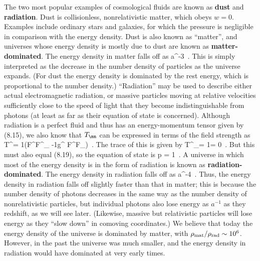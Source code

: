 \documentclass[12pt]{article}
\begin{document}
The two most popular examples of cosmological fluids are
known as {\bf dust} and {\bf radiation}.  Dust is collisionless,
nonrelativistic matter, which obeys $w=0$.  Examples include 
ordinary stars and galaxies, for which the pressure is 
negligible in comparison with the energy density.  Dust is also
known as ``matter'', and universes whose energy density is mostly
due to dust are
known as {\bf matter-dominated}.  The energy density in matter
falls off as 
\be
  \rho\propto a^{-3}\ .\label{8.24}
\ee
This is simply interpreted
as the decrease in the number density of particles as the universe
expands.  (For dust the energy density is dominated by the rest
energy, which is proportional to the number density.)  ``Radiation''
may be used to describe either actual electromagnetic radiation, or
massive particles moving at relative velocities sufficiently close to 
the speed of light that they become indistinguishable from photons (at
least as far as their equation of state is concerned).
Although radiation is a perfect fluid and thus has an energy-momentum
tensor given by (8.15), we also know that $T_\mn$ can be expressed in
terms of the field strength as
\be
  T^\mn = {1\over{4\pi}}(F^{\mu\lambda}F^\nu{}_\lambda
  -{1}g^{\mu\nu} F^{\lambda\sigma}F_{\lambda\sigma})\ .
  \label{8.25}
\ee
The trace of this is given by
\be
  T^\mu{}_\mu = {1\over{4\pi}} = 0\ .\label{8.26}
\ee
But this must also equal (8.19), so the equation of state is
\be
  p = {1}\rho\ .\label{8.27}
\ee
A universe in which most of the energy density is in the form of
radiation is known as {\bf radiation-dominated}.  The energy
density in radiation falls off as
\be
  \rho \propto a^{-4}\ .\label{8.28}
\ee
Thus, the energy density in radiation falls off slightly faster
than that in matter; this is because the number density of photons
decreases in the same way as the number density of nonrelativistic
particles, but individual photons also lose energy as $a^{-1}$
as they redshift, as we will see later.  (Likewise, massive but
relativistic particles will lose energy as they ``slow down'' in
comoving coordinates.)  We believe that today the
energy density of the universe is dominated by matter, with
$\rho_{\rm mat}/\rho_{\rm rad}\sim10^6$.  However, in the past 
the universe was much smaller, and the energy density in radiation
would have dominated at very early times.
\end{document}
